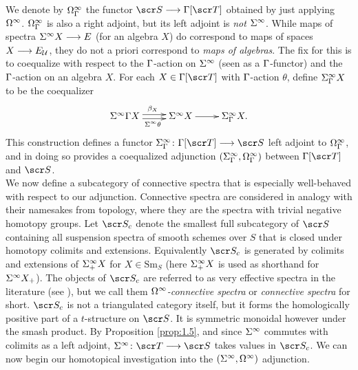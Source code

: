 \documentclass{amsart}
\theoremstyle{definition}
\begin{document}
We denote by $\Omega^{\infty}_{\Gamma}$ the functor $\sS \rtarr \GA[\sT]$ obtained by just applying $\Omega^{\infty}$. $\Omega^{\infty}_{\Gamma}$ is also a right adjoint, but its left adjoint is \emph{not} $\Sigma^{\infty}$. While maps of spectra $\Sigma^{\infty} X \longrightarrow E$ (for an algebra $X$) do correspond to maps of spaces $X \longrightarrow E_{{\mathcal{U}}}$, they do not a priori correspond to \emph{maps of algebras}. The fix for this is to coequalize with respect to the $\Gamma$-action on $\Sigma^{\infty}$ (seen as a $\Gamma$-functor) and the $\Gamma$-action on an algebra $X$. For each $X \in \GA[\sT]$ with $\Gamma$-action $\theta$, define $\Sigma^{\infty}_{\Gamma}X$ to be the coequalizer 
\[\xymatrix{
\SI^{\infty}\GA X \ar@<-0.5ex>[r]_{\SI^{\infty}\theta} \ar@<0.5ex>[r]^{\beta_X} & \SI^{\infty}X \ar[r]& \SI^{\infty}_{\GA}X.
}\]
\noindent This construction defines a functor $\SI^{\infty}_{\GA} \colon \GA[\sT] \rtarr \sS$ left adjoint to $\Omega^{\infty}_{\Gamma}$, and in doing so provides a coequalized adjunction $(\Sigma^{\infty}_{\Gamma},\Omega^{\infty}_{\Gamma})$ between $\GA[\sT]$ and $\sS$.\\

We now define a subcategory of connective spectra that is especially well-behaved with respect to our adjunction. Connective spectra are considered in analogy with their namesakes from topology, where they are the spectra with trivial negative homotopy groups. Let $\sS_c$ denote the smallest full subcategory of $\sS$ containing all suspension spectra of smooth schemes over $S$ that is closed under homotopy colimits and extensions. Equivalently $\sS_c$ is generated by colimits and extensions of $\Sigma^{\infty}_+ X$ for $X \in \mathrm{Sm}_S$ (here $\Sigma^{\infty}_+ X$ is used as shorthand for $\Sigma^{\infty}X_+$). The objects of $\sS_c$ are referred to as very effective spectra in the literature (see \cite[Definition 5.5]{SO12veff}), but we call them \emph{$\Omega^{\infty}$-connective spectra} or \emph{connective spectra} for short. $\sS_c$ is not a triangulated category itself, but it forms the homologically positive part of a $t$-structure on $\sS$. It is symmetric monoidal however under the smash product. By Proposition \ref{prop:1.5}, and since $\Sigma^{\infty}$ commutes with colimits as a left adjoint, $\SI^{\infty} \colon \sT \rtarr \sS$ takes values in $\sS_c$. We can now begin our homotopical investigation into the $(\Sigma^{\infty},\Omega^{\infty})$ adjunction.
\end{document}
